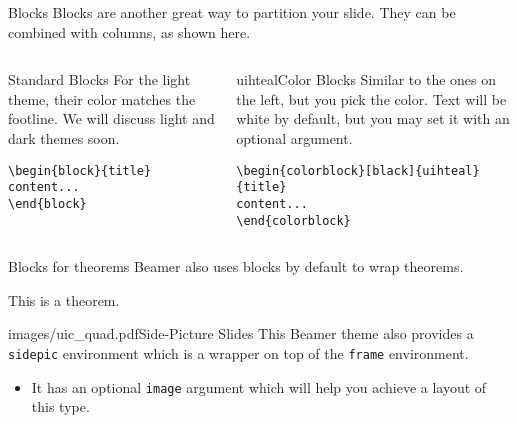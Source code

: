\documentclass{beamer}
\begin{document}
\begin{frame}[fragile]{Blocks}
Blocks are another great way to partition your slide. They can be combined with columns, as shown here.
\begin{columns}
\begin{column}{0.3\textwidth}
\begin{block}{Standard Blocks}
For the light theme, their color matches the footline. We will discuss light and dark themes soon.
\begin{verbatim}
\begin{block}{title}
content...
\end{block}
\end{verbatim}
\end{block}
\end{column}
\begin{column}{0.7\textwidth}
\begin{colorblock}[black]{uihteal}{Color Blocks}
Similar to the ones on the left, but you pick the color. Text will be white by 
default, but you may set it with an optional argument.
\small
\begin{verbatim}
\begin{colorblock}[black]{uihteal}{title}
content...
\end{colorblock}
\end{verbatim}
\end{colorblock}
\end{column}
\end{columns}
\end{frame}


\begin{frame}[fragile]{Blocks for theorems}
Beamer also uses blocks by default to wrap theorems.
\begin{theorem} This is a theorem. \end{theorem}
\end{frame}


\begin{sidepic}{images/uic_quad.pdf}{Side-Picture Slides}
This Beamer theme also provides a \texttt{sidepic} environment which is a wrapper on top of the \texttt{frame} environment.
\begin{itemize}
\item It has an optional \texttt{image} argument which will help you achieve a layout of this type.
\end{itemize}
\end{sidepic}


\renewcommand{\algorithmicrequire}{\textbf{Input:}}
\renewcommand{\algorithmicensure}{\textbf{Output:}}
\newcommand*\CALL[2]{\textsc{#1}(#2)}
\newcommand*\ANNOTATE[1]{\hfill\(\triangleright\) #1}%
\end{document}
